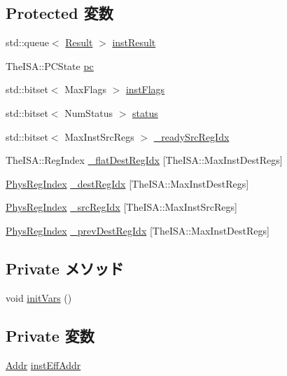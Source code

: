 \subsection*{Protected 変数}
\begin{DoxyCompactItemize}
\item 
std::queue$<$ \hyperlink{unionBaseDynInst_1_1Result}{Result} $>$ \hyperlink{classBaseDynInst_a4ed9dfc2276eac05ce2f8a65849c2bf8}{instResult}
\item 
TheISA::PCState \hyperlink{classBaseDynInst_ad3585c83b0eac985107aa5a86e43e1b4}{pc}
\item 
std::bitset$<$ MaxFlags $>$ \hyperlink{classBaseDynInst_a4bc909cbac3face1caf422952afdd400}{instFlags}
\item 
std::bitset$<$ NumStatus $>$ \hyperlink{classBaseDynInst_aa3a3e4b13899ec096589e2e0c76f25bc}{status}
\item 
std::bitset$<$ MaxInstSrcRegs $>$ \hyperlink{classBaseDynInst_a78a797b8c24ad873d0cbe5f52487b02f}{\_\-readySrcRegIdx}
\item 
TheISA::RegIndex \hyperlink{classBaseDynInst_a44085d1f8566ca30fef0c6787999c79b}{\_\-flatDestRegIdx} \mbox{[}TheISA::MaxInstDestRegs\mbox{]}
\item 
\hyperlink{o3_2comm_8hh_a5ec29599c4bc29a3054c451674969e7b}{PhysRegIndex} \hyperlink{classBaseDynInst_a1536987a8d6f8490fc850b9cc95a9eb9}{\_\-destRegIdx} \mbox{[}TheISA::MaxInstDestRegs\mbox{]}
\item 
\hyperlink{o3_2comm_8hh_a5ec29599c4bc29a3054c451674969e7b}{PhysRegIndex} \hyperlink{classBaseDynInst_a648b3ab7be47d79ef8eb06b5f5238e92}{\_\-srcRegIdx} \mbox{[}TheISA::MaxInstSrcRegs\mbox{]}
\item 
\hyperlink{o3_2comm_8hh_a5ec29599c4bc29a3054c451674969e7b}{PhysRegIndex} \hyperlink{classBaseDynInst_a32bf6cb0ac0bfb27a8b60945ca3c3603}{\_\-prevDestRegIdx} \mbox{[}TheISA::MaxInstDestRegs\mbox{]}
\end{DoxyCompactItemize}
\subsection*{Private メソッド}
\begin{DoxyCompactItemize}
\item 
void \hyperlink{classBaseDynInst_a1b19937d8cca25bf52a51ae7de67ea94}{initVars} ()
\end{DoxyCompactItemize}
\subsection*{Private 変数}
\begin{DoxyCompactItemize}
\item 
\hyperlink{base_2types_8hh_af1bb03d6a4ee096394a6749f0a169232}{Addr} \hyperlink{classBaseDynInst_aaa54d2440fad0984a0a8edbcade8c26f}{instEffAddr}
\end{DoxyCompactItemize}
